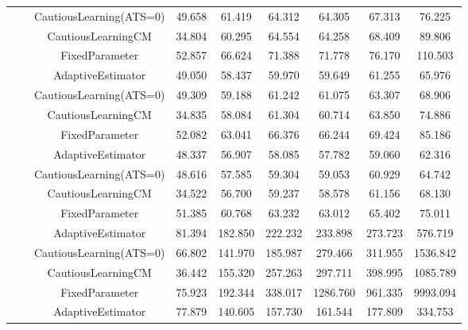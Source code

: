 \begin{table}[!h]
\begin{tabular}[t]{ccccccccc}
 &  & CautiousLearning(ATS=0) & 49.658 & 61.419 & 64.312 & 64.305 & 67.313 & 76.225\\

 &  & CautiousLearningCM & 34.804 & 60.295 & 64.554 & 64.258 & 68.409 & 89.806\\

 & \multirow[t]{-4}{*}{\centering\arraybackslash 1.00} & FixedParameter & 52.857 & 66.624 & 71.388 & 71.778 & 76.170 & 110.503\\
\cmidrule{2-9}
 &  & AdaptiveEstimator & 49.050 & 58.437 & 59.970 & 59.649 & 61.255 & 65.976\\

 &  & CautiousLearning(ATS=0) & 49.309 & 59.188 & 61.242 & 61.075 & 63.307 & 68.906\\

 &  & CautiousLearningCM & 34.835 & 58.084 & 61.304 & 60.714 & 63.850 & 74.886\\

 & \multirow[t]{-4}{*}{\centering\arraybackslash 1.25} & FixedParameter & 52.082 & 63.041 & 66.376 & 66.244 & 69.424 & 85.186\\
\cmidrule{2-9}
 &  & AdaptiveEstimator & 48.337 & 56.907 & 58.085 & 57.782 & 59.060 & 62.316\\

 &  & CautiousLearning(ATS=0) & 48.616 & 57.585 & 59.304 & 59.053 & 60.929 & 64.742\\

 &  & CautiousLearningCM & 34.522 & 56.700 & 59.237 & 58.578 & 61.156 & 68.130\\

\multirow[t]{-28}{*}{\centering\arraybackslash 50} & \multirow[t]{-4}{*}{\centering\arraybackslash 1.50} & FixedParameter & 51.385 & 60.768 & 63.232 & 63.012 & 65.402 & 75.011\\
\cmidrule{1-9}
 &  & AdaptiveEstimator & 81.394 & 182.850 & 222.232 & 233.898 & 273.723 & 576.719\\

 &  & CautiousLearning(ATS=0) & 66.802 & 141.970 & 185.987 & 279.466 & 311.955 & 1536.842\\

 &  & CautiousLearningCM & 36.442 & 155.320 & 257.263 & 297.711 & 398.995 & 1085.789\\

 & \multirow[t]{-4}{*}{\centering\arraybackslash 0.25} & FixedParameter & 75.923 & 192.344 & 338.017 & 1286.760 & 961.335 & 9993.094\\
\cmidrule{2-9}
 &  & AdaptiveEstimator & 77.879 & 140.605 & 157.730 & 161.544 & 177.809 & 334.753\\


\end{tabular}
\end{table}
